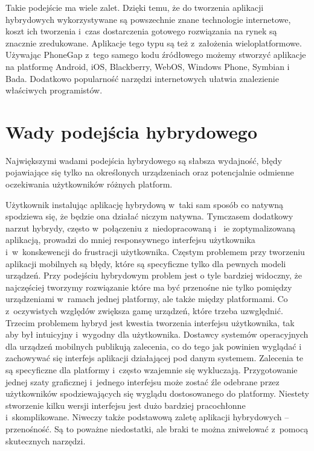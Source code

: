 \documentclass[brudnopis]{xmgr}
\begin{document}
Takie podejście ma wiele zalet. Dzięki temu, że do tworzenia aplikacji hybrydowych wykorzystywane są powszechnie znane technologie internetowe, koszt ich tworzenia i~czas dostarczenia
gotowego rozwiązania na rynek są znacznie zredukowane. Aplikacje tego typu są też
z~założenia wieloplatformowe. Używając PhoneGap z~tego samego kodu źródłowego
możemy stworzyć aplikacje na platformę Android, iOS, Blackberry, WebOS,
Windows Phone, Symbian i Bada. Dodatkowo popularność narzędzi internetowych
ułatwia znalezienie właściwych programistów.

\section{Wady podejścia hybrydowego}
Największymi wadami podejścia hybrydowego są słabsza wydajność, błędy
pojawiające się tylko na określonych urządzeniach oraz potencjalnie odmienne oczekiwania użytkowników różnych platform. 

Użytkownik instalując aplikację hybrydową w~taki sam sposób co 
natywną spodziewa się, że będzie ona działać niczym natywna. Tymczasem
dodatkowy narzut hybrydy, często w~połączeniu z~niedopracowaną i ~ie
zoptymalizowaną aplikacją, prowadzi do mniej responsywnego interfejsu
użytkownika i~w~konskewencji do frustracji użytkownika. Częstym problemem przy
tworzeniu aplikacji mobilnych są błędy, które są specyficzne tylko dla pewnych modeli urządzeń. Przy podejściu hybrydowym problem jest o tyle bardziej widoczny, że
najczęściej tworzymy rozwiązanie które ma być przenośne nie tylko pomiędzy urządzeniami w~ramach jednej platformy, ale także między platformami. Co z~oczywistych względów zwiększa gamę urządzeń, które trzeba uzwględnić. Trzecim problemem hybryd jest kwestia
tworzenia interfejsu użytkownika, tak aby był intuicyjny i~wygodny dla użytkownika. Dostawcy systemów operacyjnych dla urządzeń
mobilnych publikują zalecenia, co do tego jak powinien wyglądać i zachowywać się interfejs aplikacji
działającej pod danym systemem. Zalecenia te są specyficzne dla platformy i~często
wzajemnie się wykluczają. Przygotowanie jednej szaty graficznej i~jednego interfejsu
może zostać źle odebrane przez użytkowników spodziewających się wyglądu
dostosowanego do platformy. Niestety stworzenie kilku wersji interfejsu jest dużo
bardziej pracochłonne i~skomplikowane. Niweczy także podstawową zaletę aplikacji
hybrydowych – przenośność. 
Są to poważne niedostatki, ale braki te można zniwelować z~pomocą skutecznych narzędzi.
\end{document}
